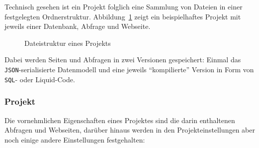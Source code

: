 Technisch gesehen ist ein Projekt folglich eine Sammlung von Dateien in einer festgelegten Ordnerstruktur. Abbildung~\ref{fig:project-disk-structure} zeigt ein beispielhaftes Projekt mit jeweils einer Datenbank, Abfrage und Webseite.

\begin{figure}[h!]
  \caption{Dateistruktur eines Projekts}
  \label{fig:project-disk-structure}
\end{figure}

Dabei werden Seiten und Abfragen in zwei Versionen gespeichert: Einmal das \texttt{JSON}-serialisierte Datenmodell und eine jeweils "`kompilierte"' Version in Form von \texttt{SQL}- oder Liquid-Code.

\subsubsection{Projekt}
\label{sec:data-model-project}

Die vornehmlichen Eigenschaften eines Projektes sind die darin enthaltenen Abfragen und Webseiten, darüber hinaus werden in den Projekteinstellungen aber noch einige andere Einstellungen festgehalten:

